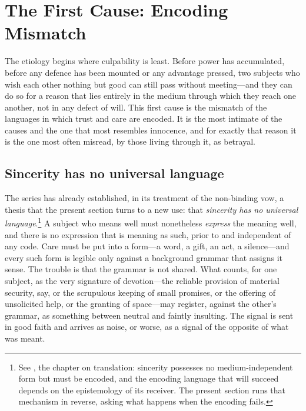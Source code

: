 \section{The First Cause: Encoding Mismatch}
\label{p17:sec:encoding}

\noindent
The etiology begins where culpability is least. Before power has accumulated, before any defence has been mounted or any advantage pressed, two subjects who wish each other nothing but good can still pass without meeting---and they can do so for a reason that lies entirely in the medium through which they reach one another, not in any defect of will. This first cause is the mismatch of the languages in which trust and care are encoded. It is the most intimate of the causes and the one that most resembles innocence, and for exactly that reason it is the one most often misread, by those living through it, as betrayal.

\subsection{Sincerity has no universal language}
\label{p17:sub:encoding-nolang}

The series has already established, in its treatment of the non-binding vow, a thesis that the present section turns to a new use: that \emph{sincerity has no universal language}.\footnote{See \textcite{paperxiii}, the chapter on translation: sincerity possesses no medium-independent form but must be encoded, and the encoding language that will succeed depends on the epistemology of its receiver. The present section runs that mechanism in reverse, asking what happens when the encoding fails.} A subject who means well must nonetheless \emph{express} the meaning well, and there is no expression that is meaning as such, prior to and independent of any code. Care must be put into a form---a word, a gift, an act, a silence---and every such form is legible only against a background grammar that assigns it sense. The trouble is that the grammar is not shared. What counts, for one subject, as the very signature of devotion---the reliable provision of material security, say, or the scrupulous keeping of small promises, or the offering of unsolicited help, or the granting of space---may register, against the other's grammar, as something between neutral and faintly insulting. The signal is sent in good faith and arrives as noise, or worse, as a signal of the opposite of what was meant.

